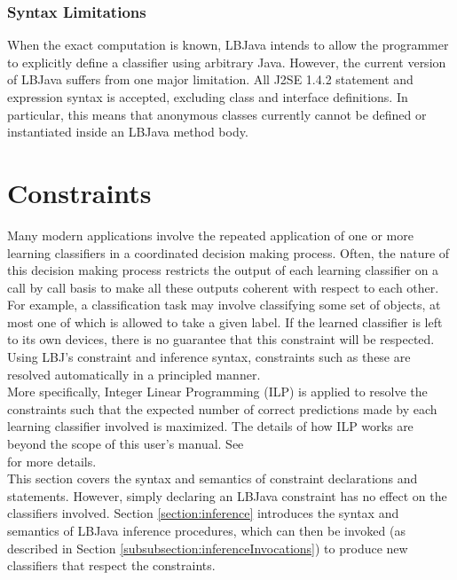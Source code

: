 \subsubsection{Syntax Limitations}
When the exact computation is known, LBJava intends to allow the programmer to
explicitly define a classifier using arbitrary Java.  However, the current
version of LBJava suffers from one major limitation.  All J2SE 1.4.2 statement
and expression syntax is accepted, excluding class and interface definitions.
In particular, this means that anonymous classes currently cannot be defined
or instantiated inside an LBJava method body.

\section{Constraints} \label{section:constraints}

Many modern applications involve the repeated application of one or more
learning classifiers in a coordinated decision making process.  Often, the
nature of this decision making process restricts the output of each learning
classifier on a call by call basis to make all these outputs coherent with
respect to each other.  For example, a classification task may involve
classifying some set of objects, at most one of which is allowed to take a
given label.  If the learned classifier is left to its own devices, there is
no guarantee that this constraint will be respected.  Using LBJ's constraint
and inference syntax, constraints such as these are resolved automatically in
a principled manner. \\

More specifically, Integer Linear Programming (ILP) is applied to resolve the
constraints such that the expected number of correct predictions made by each
learning classifier involved is maximized.  The details of how ILP works are
beyond the scope of this user's manual.  See\\ \cite{PunyakanokRoYi08} for
more details. \\

This section covers the syntax and semantics of constraint declarations and
statements.  However, simply declaring an LBJava constraint has no effect on the
classifiers involved.  Section \ref{section:inference} introduces the syntax
and semantics of LBJava inference procedures, which can then be invoked (as
described in Section \ref{subsubsection:inferenceInvocations}) to produce new
classifiers that respect the constraints.

